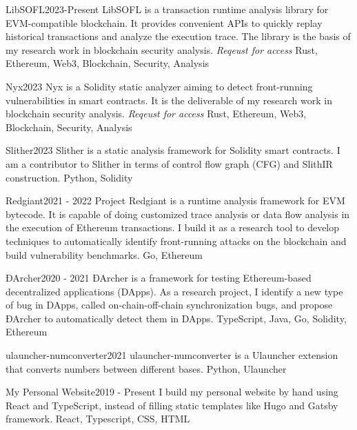 \documentclass[localFont,alternative]{documentMETADATA}
\begin{document}
\begin{projects}
	\project
	{LibSOFL}{2023-Present}
	{LibSOFL is a transaction runtime analysis library for EVM-compatible blockchain. It provides convenient APIs to quickly replay historical transactions and analyze the execution trace. The library is the basis of my research work in blockchain security analysis.}
	{\textit{Reqeust for access}}
	{Rust, Ethereum, Web3, Blockchain, Security, Analysis}

	\project
	{Nyx}{2023}
	{Nyx is a Solidity static analyzer aiming to detect front-running vulnerabilities in smart contracts. It is the deliverable of my research work in blockchain security analysis.}
	{\textit{Reqeust for access}}
	{Rust, Ethereum, Web3, Blockchain, Security, Analysis}


	\project
	{Slither}{2023}
	{}
	{Slither is a static analysis framework for Solidity smart contracts. I am a contributor to Slither in terms of control flow graph (CFG) and SlithIR construction.}
	{Python, Solidity}

	\project
	{Redgiant}{2021 - 2022}
	{}
	{Project Redgiant is a runtime analysis framework for EVM bytecode. It is capable of doing customized trace analysis or data flow analysis in the execution of Ethereum transactions. I build it as a research tool to develop techniques to automatically identify front-running attacks on the blockchain and build vulnerability benchmarks.}
	{Go, Ethereum}

	\project
	{ĐArcher}{2020 - 2021}
	{}
	{ĐArcher is a framework for testing Ethereum-based decentralized applications (DApps). As a research project, I identify a new type of bug in DApps, called on-chain-off-chain synchronization bugs, and propose ĐArcher to automatically detect them in DApps.}
	{TypeScript, Java, Go, Solidity, Ethereum}

	\project
	{ulauncher-numconverter}{2021}
	{}
	{ulauncher-numconverter is a Ulauncher extension that converts numbers between different bases.}
	{Python, Ulauncher}


	\project
	{My Personal Website}{2019 - Present}
	{}
	{I build my personal website by hand using React and TypeScript, instead of filling static templates like Hugo and Gatsby framework.}
	{React, Typescript, CSS, HTML}

\end{projects}
\end{document}
